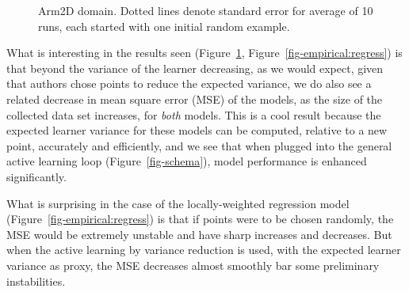 \documentclass[
  letterpaper,
  numbers=noenddot,
  DIV=11,
  oneside]{scrreprt}
\theoremstyle{remark}
\begin{document}
\begin{figure}


\caption{\label{fig-empirical:gauss}Arm2D domain. Dotted lines denote
standard error for average of 10 runs, each started with one initial
random example.}

\end{figure}%

What is interesting in the results seen
(Figure~\ref{fig-empirical:gauss}, Figure~\ref{fig-empirical:regress})
is that beyond the variance of the learner decreasing, as we would
expect, given that authors chose points to reduce the expected variance,
we do also see a related decrease in mean square error (MSE) of the
models, as the size of the collected data set increases, for \emph{both}
models. This is a cool result because the expected learner variance for
these models can be computed, relative to a new point, accurately and
efficiently, and we see that when plugged into the general active
learning loop (Figure~\ref{fig-schema}), model performance is enhanced
significantly.

What is surprising in the case of the locally-weighted regression model
(Figure~\ref{fig-empirical:regress}) is that if points were to be chosen
randomly, the MSE would be extremely unstable and have sharp increases
and decreases. But when the active learning by variance reduction is
used, with the expected learner variance as proxy, the MSE decreases
almost smoothly bar some preliminary instabilities.
\end{document}
